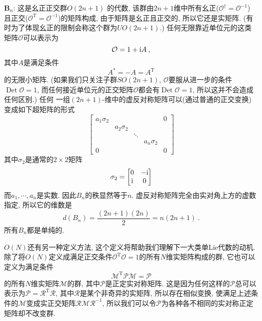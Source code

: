 \noindent $\bm{B}_{n}$: 这是幺正正交群$O(2n+1)$%
的代数, 该群由$2n+1$维中所有幺正($\mathcal{O}^{\dag }=\mathcal{O}^{-1}$)%
且正交($\mathcal{O}^{\mathrm{T}}=\mathcal{O}^{-1}$)的矩阵构成, 由于矩阵是幺正且正交的, 
所以它还是实矩阵. (有时为了体现幺正的限制会称这个群为$UO(2n+1)$.) 任何无限靠近单位元的这类矩阵$\mathcal{O}$可以表示为
\[
\mathcal{O}=1+\mathrm{i} A\:, 
\]%
其中$A$是满足条件
\[
A^{\ast }=-A=A^{\mathrm{T}} 
\]%
的无限小矩阵. (如果我们只关注子群$SO(2n+1)$, $\mathcal{O}$要服从进一步的条件$\operatorname{Det} \mathcal{O}=1$,
而任何接近单位元的正交矩阵$\mathcal{O}$都会有$\operatorname{Det} \mathcal{O}=1$, 所以这并不会造成任何区别.) 任何%
一组$(2n{+}1)$-维中的虚反对称矩阵可以(通过普通的正交变换)变成如下超矩阵的形式
\[
    \begin{bmatrix}
        a_{1}\sigma _{2} &  &  &  & 0 \\
        & a_{2}\sigma _{2} &  &  &  \\
        &  & \ddots  &  &  \\
        &  &  & a_{n}\sigma _{2} &  \\
        0 &  &  &  & 0%
    \end{bmatrix}
\]%
其中$\sigma _{2}$是通常的$2\times 2$矩阵
\[
\sigma _{2}=\begin{bmatrix}
    0 & -\mi \\
    \mi & 0%
\end{bmatrix}
\]%
而$a_{1},\cdots ,a_{n}$是实数. 因此$B_{n}$的秩显然等于$n$. 虚反对称矩阵完全由实对角上方的虚数指定, 所以它的维数是
\[
d(B_{n})=\frac{(2n+1)(2n)}{2}=n(2n+1)\:. 
\]%
所有$B_{n}$都是单纯的.

$O(N)$还有另一种定义方法, 这个定义将帮助我们理解下一大类单Lie代数的动机. 
除了将$O(N)$定义成满足正交条件$\mathcal{O}^{\mathrm{T}}\mathcal{O}=1$的所有$N$维实矩阵构成的群, 它也可以定义为满足条件
\[
\mathscr{M}^{\mathrm{T}}\mathscr{P}\mathscr{M}=\mathscr{P}
\]%
的所有$N$维实矩阵$\mathscr{M}$的群, 其中$\mathscr{P}$是正定实对称矩阵. 这是因为任何这样的$\mathscr{P}$总可以表示为$\mathscr{P}=\mathscr{R}^{\mathrm{T}}\mathscr{R}$, 其中$\mathscr{R}$是某个非奇异的实矩阵, 所以存在相似变换, 使满足上述条件的$\mathscr{M}$变成实正交矩阵$\mathscr{R}\mathscr{M}\mathscr{R}^{-1}$, 所以我们可以令$\mathscr{P}$为各种各不相同的实对称正定矩阵却不改变群.

